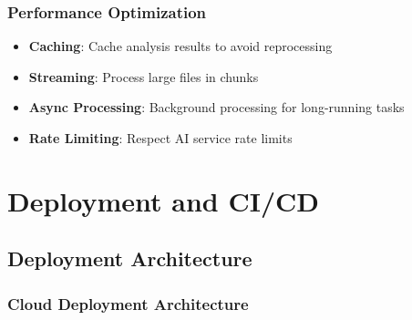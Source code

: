 \documentclass[12pt,a4paper]{article}
\begin{document}
\subsubsection{Performance Optimization}
\begin{itemize}
    \item \textbf{Caching}: Cache analysis results to avoid reprocessing
    \item \textbf{Streaming}: Process large files in chunks
    \item \textbf{Async Processing}: Background processing for long-running tasks
    \item \textbf{Rate Limiting}: Respect AI service rate limits
\end{itemize}

\section{Deployment and CI/CD}

\subsection{Deployment Architecture}

\subsubsection{Cloud Deployment Architecture}
\end{document}
